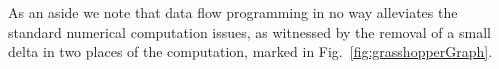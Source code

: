 As an aside we note that data flow programming in no way alleviates the standard numerical computation issues, as witnessed by the removal of a small delta in two places of the computation, marked \textdaggerdbl\; in Fig.~\ref{fig:grasshopperGraph}.






